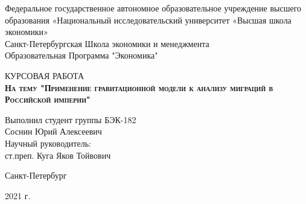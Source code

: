 \begin{center}
	Федеральное государственное автономное образовательное учреждение высшего образования «Национальный исследовательский университет «Высшая школа экономики»
	\\
	\bigskip
	Санкт-Петербургская Школа экономики и менеджмента \\
	Образовательная Программа "Экономика"
\end{center}

\vspace{8em}

\begin{center}
	{\Large КУРСОВАЯ РАБОТА}\\
	\textsc{\textbf{
			На тему
			\linebreak
			"Применение гравитационной модели к анализу миграций в Российской империи"}}
\end{center}

\vspace{2em}

\hfill\parbox{16cm}{
	\hspace*{5cm}\hspace*{-5cm}Выполнил студент группы БЭК-182\\
	Соснин Юрий Алексеевич\\
	
	\hspace*{5cm}\hspace*{-5cm}Научный руководитель:\\
	ст.преп. Куга Яков Тойвович\\
}

\vspace{\fill}

\begin{center}
	Санкт-Петербург
	
	2021 г.
\end{center}
\thispagestyle{empty}

\clearpage